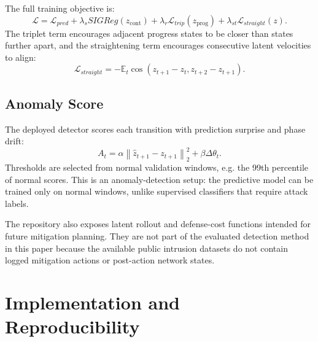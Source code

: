 \documentclass[runningheads]{llncs}
\begin{document}
The full training objective is:
\begin{equation}
\mathcal{L} =
\mathcal{L}_{pred}
+\lambda_s SIGReg(z_{\mathrm{cont}})
+\lambda_r \mathcal{L}_{trip}(z_{\mathrm{prog}})
+\lambda_{st}\mathcal{L}_{straight}(z).
\end{equation}
The triplet term encourages adjacent progress states to be closer than states
further apart, and the straightening term encourages consecutive latent
velocities to align:
\begin{equation}
\mathcal{L}_{straight} =
-\mathbb{E}_t
\cos(z_{t+1}-z_t, z_{t+2}-z_{t+1}).
\end{equation}

\subsection{Anomaly Score}

The deployed detector scores each transition with prediction surprise and
phase drift:
\begin{equation}
A_t =
\alpha \left\|\hat{z}_{t+1}-z_{t+1}\right\|_2^2
+\beta \Delta\theta_t.
\end{equation}
Thresholds are selected from normal validation windows, e.g. the 99th
percentile of normal scores. This is an anomaly-detection setup: the predictive
model can be trained only on normal windows, unlike supervised classifiers that
require attack labels.

The repository also exposes latent rollout and defense-cost functions intended
for future mitigation planning. They are not part of the evaluated detection
method in this paper because the available public intrusion datasets do not
contain logged mitigation actions or post-action network states.

\section{Implementation and Reproducibility}
\end{document}
